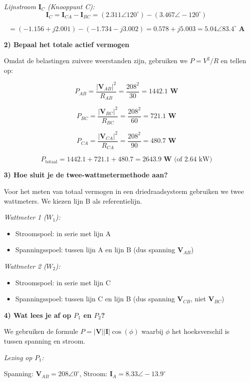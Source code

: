 \documentclass[a4paper,11pt]{article}
\begin{document}
\begin{oefenblok}[title=Oefening: Onevenwichtige Delta-belasting met twee-wattmetermethode]
\textit{Lijnstroom $\mathbf{I}_C$ (Knooppunt C):}
$$\mathbf{I}_C = \mathbf{I}_{CA} - \mathbf{I}_{BC} = (2.311 \angle 120^\circ) - (3.467 \angle -120^\circ)$$

$$= (-1.156 + j2.001) - (-1.734 - j3.002) = 0.578 + j5.003 = \boxed{\mathbf{5.04 \angle 83.4^\circ \text{ A}}}$$

\noindent\textbf{2) Bepaal het totale actief vermogen}

Omdat de belastingen zuivere weerstanden zijn, gebruiken we $P = V^2 / R$ en tellen op:

$$P_{AB} = \frac{|\mathbf{V}_{AB}|^2}{R_{AB}} = \frac{208^2}{30} = \mathbf{1442.1\text{ W}}$$

$$P_{BC} = \frac{|\mathbf{V}_{BC}|^2}{R_{BC}} = \frac{208^2}{60} = \mathbf{721.1\text{ W}}$$

$$P_{CA} = \frac{|\mathbf{V}_{CA}|^2}{R_{CA}} = \frac{208^2}{90} = \mathbf{480.7\text{ W}}$$

$$\boxed{P_{\text{totaal}} = 1442.1 + 721.1 + 480.7 = \mathbf{2643.9\text{ W}} \text{ (of } 2.64\text{ kW})}$$

\noindent\textbf{3) Hoe sluit je de twee-wattmetermethode aan?}

Voor het meten van totaal vermogen in een driedraadsysteem gebruiken we twee wattmeters. We kiezen lijn B als referentielijn.

\textit{Wattmeter 1 ($W_1$):}
\begin{itemize}
    \item Stroomspoel: in serie met lijn A
    \item Spanningsspoel: tussen lijn A en lijn B (dus spanning $\mathbf{V}_{AB}$)
\end{itemize}

\textit{Wattmeter 2 ($W_2$):}
\begin{itemize}
    \item Stroomspoel: in serie met lijn C
    \item Spanningsspoel: tussen lijn C en lijn B (dus spanning $\mathbf{V}_{CB}$, niet $\mathbf{V}_{BC}$)
\end{itemize}

\noindent\textbf{4) Wat lees je af op $P_1$ en $P_2$?}

We gebruiken de formule $P = |\mathbf{V}| |\mathbf{I}| \cos(\phi)$ waarbij $\phi$ het hoeksverschil is tussen spanning en stroom.

\textit{Lezing op $P_1$:}

Spanning: $\mathbf{V}_{AB} = 208 \angle 0^\circ$, Stroom: $\mathbf{I}_A = 8.33 \angle -13.9^\circ$


\end{oefenblok}
\end{document}
